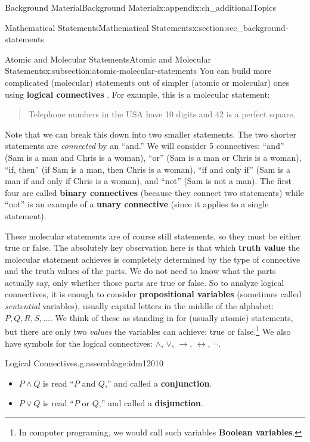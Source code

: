 \documentclass[oneside,10pt,]{book}
\newcommand{\terminology}[1]{\textbf{#1}}
\numberwithin{equation}{chapter}
\def\iff{\leftrightarrow}
\def\imp{\rightarrow}
\begin{document}
\begin{appendixptx}{Background Material}{}{Background Material}{}{}{x:appendix:ch_additionalTopics}
\begin{sectionptx}{Mathematical Statements}{}{Mathematical Statements}{}{}{x:section:sec_background-statements}
\begin{subsectionptx}{Atomic and Molecular Statements}{}{Atomic and Molecular Statements}{}{}{x:subsection:atomic-molecular-statements}
You can build more complicated (molecular) statements out of simpler (atomic or molecular) ones using \terminology{logical connectives} . For example, this is a molecular statement:%
\begin{quote}%
Telephone numbers in the USA have 10 digits and 42 is a perfect square.%
\end{quote}
Note that we can break this down into two smaller statements. The two shorter statements are \emph{connected} by an ``and.'' We will consider 5 connectives: ``and'' (Sam is a man and Chris is a woman), ``or'' (Sam is a man or Chris is a woman), ``if\textellipsis{}, then\textellipsis{}'' (if Sam is a man, then Chris is a woman), ``if and only if'' (Sam is a man if and only if Chris is a woman), and ``not'' (Sam is not a man). The first four are called \terminology{binary connectives} (because they connect two statements) while ``not'' is an example of a \terminology{unary connective} (since it applies to a single statement).%
\par
These molecular statements are of course still statements, so they must be either true or false.  The absolutely key observation here is that which \terminology{truth value}  the molecular statement achieves is completely determined by the type of connective and the truth values of the parts. We do not need to know what the parts actually say, only whether those parts are true or false. So to analyze logical connectives, it is enough to consider \terminology{propositional variables} (sometimes called \emph{sentential} variables), usually capital letters in the middle of the alphabet: \(P, Q, R, S, \ldots\).  We think of these as standing in for (usually atomic) statements, but there are only two \emph{values} the variables can achieve: true or false.\footnote{In computer programing, we would call such variables \terminology{Boolean variables}.\label{g:fn:idm12000}} \label{g:notation:idm12002} We also have symbols for the logical connectives: \(\wedge\), \(\vee\), \(\imp\), \(\iff\), \(\neg\).%
\begin{assemblage}{Logical Connectives.}{g:assemblage:idm12010}%
%
\begin{itemize}[label=\textbullet]
\item{}\(P \wedge Q\) is read ``\(P\) and \(Q\),'' and called a \terminology{conjunction}.  \label{g:notation:idm12025}%
\item{}\(P \vee Q\) is read ``\(P\) or \(Q\),'' and called a \terminology{disjunction}.  \label{g:notation:idm12040}%

\end{itemize}
\end{assemblage}
\end{subsectionptx}
\end{sectionptx}
\end{appendixptx}
\end{document}
